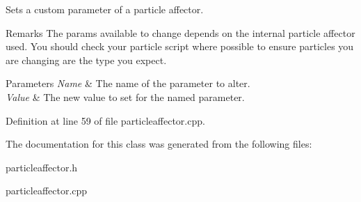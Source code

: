 Sets a custom parameter of a particle affector. 

\begin{DoxyRemark}{Remarks}
The params available to change depends on the internal particle affector used. You should check your particle script where possible to ensure particles you are changing are the type you expect. 
\end{DoxyRemark}

\begin{DoxyParams}{Parameters}
{\em Name} & The name of the parameter to alter. \\
\hline
{\em Value} & The new value to set for the named parameter. \\
\hline
\end{DoxyParams}


Definition at line 59 of file particleaffector.cpp.



The documentation for this class was generated from the following files:\begin{DoxyCompactItemize}
\item 
particleaffector.h\item 
particleaffector.cpp\end{DoxyCompactItemize}
